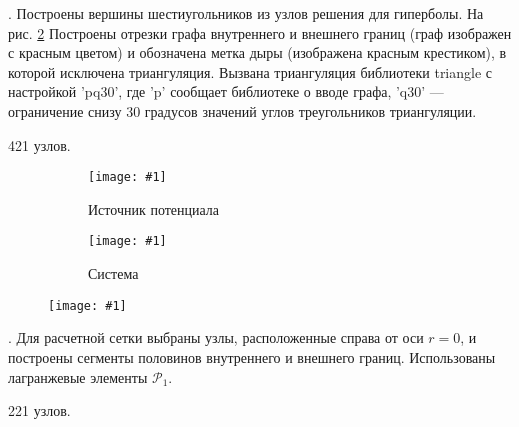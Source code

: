 
 \theexp \label{text_fullmesh}.
Построены вершины шестиугольников из узлов решения для гиперболы.
На рис. \ref{fig:fullmesh} Построены отрезки графа внутреннего и внешнего границ (граф изображен с красным цветом)
и обозначена метка дыры (изображена красным крестиком), в которой исключена триангуляция.
Вызвана триангуляция библиотеки triangle с настройкой 'pq30',
где 'p' сообщает библиотеке о вводе графа, 'q30' --- ограничение снизу 30 градусов значений углов треугольников триангуляции.

421 узлов.

\newcommand{\addtwoimg}[3]{

  \begin{figure}[H]

  \begin{subfigure}{0.5\textwidth}
  \texttt{[image: \#1]} 
  \caption{Источник потенциала}
  \end{subfigure}
  \begin{subfigure}{0.5\textwidth}
  \texttt{[image: \#1]}
  \caption{Система}
  \end{subfigure}

  \caption{#2}
  \label{#3}

  \end{figure}

}

\renewcommand{\addimg}[3]{
  \begin{figure}[H]
    \texttt{[image: \#1]}
    \caption{#2} \label{#3}
  \end{figure}
}

\addtwoimg{exps/fullmesh_1}{}{}
\addimg{exps/fullmesh_2}{}{fig:fullmesh}

 \theexp.
Для расчетной сетки выбраны узлы, расположенные справа от оси ${r = 0}$,
и построены сегменты половинов внутреннего и внешнего границ.
Использованы лагранжевые элементы ${\mathcal{P}_1}$.

221 узлов.

\newcommand{\addimgexp}[1]{
  \makeatletter
    \def\meshfn{exps/}
    \g@addto@macro\meshfn{#1}
    \g@addto@macro\meshfn{_mesh}

    \def\solvefn{exps/}
    \g@addto@macro\solvefn{#1}
    \g@addto@macro\solvefn{_solve}

    \def\rhogfn{exps/}
    \g@addto@macro\rhogfn{#1}
    \g@addto@macro\rhogfn{_rhog}
  \makeatother

  \addtwoimg{\meshfn}{Триангуляция}{}
  \addtwoimg{\solvefn}{Решение потенциального поля}{}
  \addimg{\rhogfn}{Кажущееся сопротивление}{}
}

